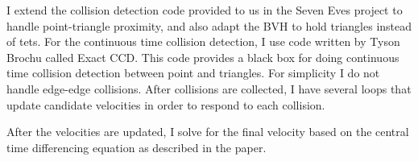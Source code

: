 \documentclass[12pt]{article} %
\begin{document}
I extend the collision detection code provided to us in the Seven Eves project to handle point-triangle proximity, and also adapt the BVH to hold triangles instead of tets. For the continuous time collision detection, I use code written by Tyson Brochu called Exact CCD. This code provides a black box for doing continuous time collision detection between point and triangles. For simplicity I do not handle edge-edge collisions. After collisions are collected, I have several loops that update candidate velocities in order to respond to each collision.

After the velocities are updated, I solve for the final velocity based on the central time differencing equation as described in the paper.
\end{document}

